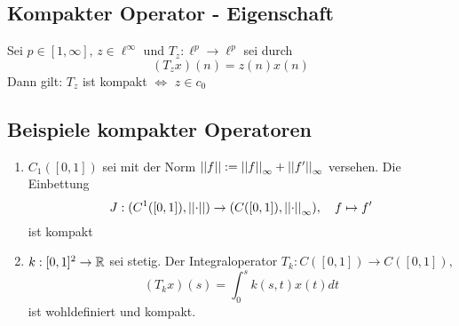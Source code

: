 \documentclass[FunkAnaskriptSS2017.tex]{subfiles}
\begin{document}
\subsection{ Kompakter Operator - Eigenschaft}
\label{B13.3}
	Sei $p\in [1,\infty],\, z\in \ell^\infty$ und $T_z : \ell^p \to \ell^p$ sei durch 
	$$(T_z x) (n) = z(n)x(n)$$\todoo[$z(n) = z_n$ ??]
	Dann gilt: $T_z$ ist kompakt $\Leftrightarrow$ $z\in c_0$
	
	
\subsection{ Beispiele kompakter Operatoren}
\label{B13.4}
	\begin{enumerate}
	\item $C_1([0,1])$ sei mit der Norm $\left\lvert \left\lvert f \right\rvert \right\rvert := \left\lvert \left\lvert f \right\rvert \right\rvert_\infty + \left\lvert \left\lvert f' \right\rvert \right\rvert_\infty$ versehen. Die Einbettung
	$$J : (C^1([0,1]),\left\lvert \left\lvert \cdot \right\rvert \right\rvert) \to (C([0,1]) , \left\lvert \left\lvert \cdot \right\rvert \right\rvert_\infty),\quad f \mapsto f'$$
	ist kompakt
	\item $k:[0,1]^2 \to \mathbb{R}$ sei stetig. Der Integraloperator $T_k : C([0,1]) \to C([0,1]),$
	$$(T_kx)(s) = \int^s_0 k(s,t)x(t) dt$$
	ist wohldefiniert und kompakt.
	\end{enumerate}
\end{document}
